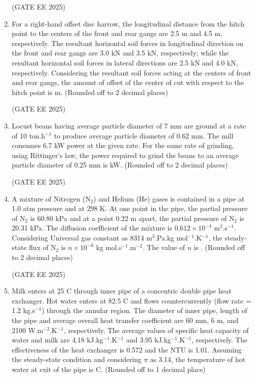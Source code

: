 \documentclass[journal,12pt,onecolumn]{IEEEtran}
\theoremstyle{remark}
\begin{document}
\begin{enumerate}
\hfill(GATE EE 2025)

\item For a right-hand offset disc harrow, the longitudinal distance from the hitch point to the centers of the front and rear gangs are 2.5 m and 4.5 m, respectively. The resultant horizontal soil forces in longitudinal direction on the front and rear gangs are 3.0 kN and 3.5 kN, respectively; while the resultant horizontal soil forces in lateral directions are 2.5 kN and 4.0 kN, respectively. Considering the resultant soil forces acting at the centers of front and rear gangs, the amount of offset of the center of cut with respect to the hitch point is \underline{\hspace{2cm}} m. (Rounded off to 2 decimal places)

\hfill(GATE EE 2025)

\item Locust beans having average particle diameter of 7 mm are ground at a rate of 10 ton.h$^{-1}$ to produce average particle diameter of 0.62 mm. The mill consumes 6.7 kW power at the given rate. For the same rate of grinding, using Rittinger's law, the power required to grind the beans to an average particle diameter of 0.25 mm is \underline{\hspace{2cm}} kW. (Rounded off to 2 decimal places)

\hfill(GATE EE 2025)

\item A mixture of Nitrogen (N$_2$) and Helium (He) gases is contained in a pipe at 1.0 atm pressure and at 298 K. At one point in the pipe, the partial pressure of N$_2$ is 60.80 kPa and at a point 0.22 m apart, the partial pressure of N$_2$ is 20.31 kPa. The diffusion coefficient of the mixture is $0.612 \times 10^{-4}$ m$^2$.s$^{-1}$. Considering Universal gas constant as 8314 m$^3$.Pa.kg mol$^{-1}$.K$^{-1}$, the steady-state flux of N$_2$ is $n \times 10^{-6}$ kg mol.s$^{-1}$.m$^{-2}$. The value of $n$ is \underline{\hspace{2cm}}. (Rounded off to 2 decimal places)

\hfill(GATE EE 2025)

\item Milk enters at 25 {\degree}C through inner pipe of a concentric double pipe heat exchanger. Hot water enters at 82.5 {\degree}C and flows countercurrently (flow rate = 1.2 kg.s$^{-1}$) through the annular region. The diameter of inner pipe, length of the pipe and average overall heat transfer coefficient are 60 mm, 6 m, and 2100 W.m$^{-2}$.K$^{-1}$, respectively. The average values of specific heat capacity of water and milk are 4.18 kJ.kg$^{-1}$.K$^{-1}$ and 3.95 kJ.kg$^{-1}$.K$^{-1}$, respectively. The effectiveness of the heat exchanger is 0.572 and the NTU is 1.01. Assuming the steady-state condition and considering $\pi$ as 3.14, the temperature of hot water at exit of the pipe is \underline{\hspace{2cm}} {\degree}C. (Rounded off to 1 decimal place)


\end{enumerate}
\end{document}
